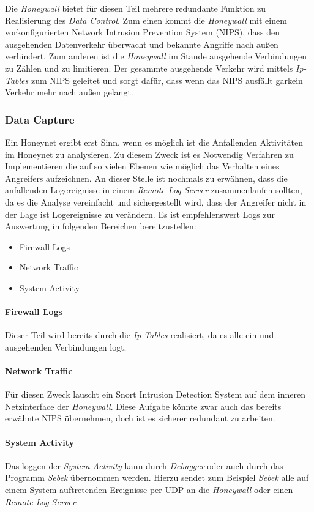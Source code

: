 Die \textit{Honeywall} bietet für diesen Teil mehrere redundante
Funktion zu Realisierung des \textit{Data Control}. Zum einen kommt
die \textit{Honeywall} mit einem vorkonfigurierten Network Intrusion
Prevention System (NIPS), dass den ausgehenden Datenverkehr überwacht
und bekannte Angriffe nach außen verhindert. Zum anderen ist die
\textit{Honeywall} im Stande ausgehende Verbindungen zu Zählen und zu
limitieren. Der gesammte ausgehende Verkehr wird mittels
\textit{Ip-Tables} zum NIPS geleitet und sorgt dafür, dass wenn das
NIPS ausfällt garkein Verkehr mehr nach außen gelangt.


\subsubsection{Data Capture} Ein Honeynet ergibt erst Sinn, wenn es
möglich ist die Anfallenden Aktivitäten im Honeynet zu analysieren. Zu
diesem Zweck ist es Notwendig Verfahren zu Implementieren die auf so
vielen Ebenen wie möglich das Verhalten eines Angreifers
aufzeichnen. An dieser Stelle ist nochmals zu erwähnen, dass die
anfallenden Logereignisse in einem \textit{Remote-Log-Server}
zusammenlaufen sollten, da es die Analyse vereinfacht und
sichergestellt wird, dass der Angreifer nicht in der Lage ist
Logereignisse zu verändern.  Es ist empfehlenswert Logs zur Auswertung
in folgenden Bereichen bereitzustellen:
\begin{itemize}
  \item Firewall Logs
  \item Network Traffic
  \item System Activity
\end{itemize}
\paragraph*{Firewall Logs} Dieser Teil wird bereits durch die
\textit{Ip-Tables} realisiert, da es alle ein und ausgehenden
Verbindungen logt.
\paragraph*{Network Traffic} Für diesen Zweck lauscht ein Snort
Intrusion Detection System auf dem inneren Netzinterface der
\textit{Honeywall}. Diese Aufgabe könnte zwar auch das bereits
erwähnte NIPS übernehmen, doch ist es sicherer redundant zu arbeiten.
\paragraph*{System Activity} Das loggen der \textit{System Activity}
kann durch \textit{Debugger} oder auch durch das Programm
\textit{Sebek} übernommen werden. Hierzu sendet zum Beispiel
\textit{Sebek} alle auf einem System auftretenden Ereignisse per UDP
an die \textit{Honeywall} oder einen \textit{Remote-Log-Server}.

